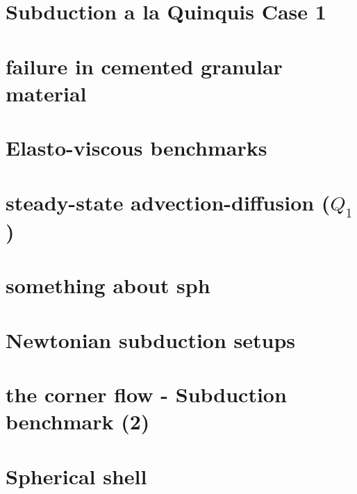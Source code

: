 \documentclass[a4paper,11pt]{report}
\begin{document}
\chapter{Subduction a la Quinquis Case 1 \label{f62}} 

\chapter{failure in cemented granular material \label{f63}} 

\chapter{Elasto-viscous benchmarks \label{f64}} 

\chapter{steady-state advection-diffusion ($Q_1$) \label{f65}} 

\chapter{something about sph \label{f66}} 

\chapter{Newtonian subduction setups \label{f67}} 

\chapter{the corner flow - Subduction benchmark (2) \label{f68}} 

\chapter{Spherical shell \label{f69}} 
\end{document}
